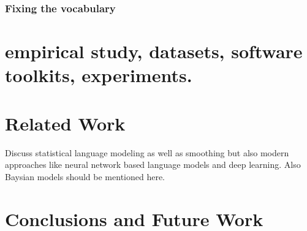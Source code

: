 \documentclass[•]{book}
\begin{document}
\subsection{Fixing the vocabulary}

\chapter{empirical study, datasets, software toolkits, experiments.} 


\chapter{Related Work}
Discuss statistical language modeling as well as smoothing but also modern approaches like neural network based language models and deep learning. Also Baysian models should be mentioned here.

\chapter{Conclusions and Future Work}
\end{document}
